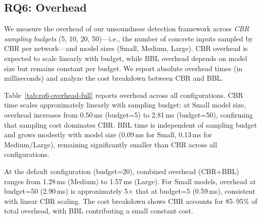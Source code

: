 
\subsection{RQ6: Overhead}

We measure the overhead of our unsoundness detection framework across \emph{CBR sampling budgets} (5, 10, 20, 50)—i.e., the number of concrete inputs sampled by CBR per network—and model sizes (Small, Medium, Large).
CBR overhead is expected to scale linearly with budget, while BBL overhead depends on model size but remains constant per budget.
We report absolute overhead times (in milliseconds) and analyze the cost breakdown between CBR and BBL.

Table~\ref{tab:rq6-overhead-full} reports overhead across all configurations.
CBR time scales approximately linearly with sampling budget:
at Small model size, overhead increases from 0.50\,ms (budget=5) to 2.81\,ms (budget=50), confirming that sampling cost dominates CBR.
BBL time is independent of sampling budget and grows modestly with model size (0.09\,ms for Small, 0.13\,ms for Medium/Large), remaining significantly smaller than CBR across all configurations.

At the default configuration (budget=20), combined overhead (CBR+BBL) ranges from 1.28\,ms (Medium) to 1.57\,ms (Large).
For Small models, overhead at budget=50 (2.90\,ms) is approximately 5× that at budget=5 (0.59\,ms), consistent with linear CBR scaling.
The cost breakdown shows CBR accounts for 85--95\% of total overhead, with BBL contributing a small constant cost.

